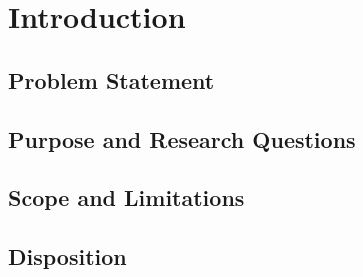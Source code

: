 \chapter{Introduction}

\section{Problem Statement}

\section{Purpose and Research Questions}

\section{Scope and Limitations}

\section{Disposition}